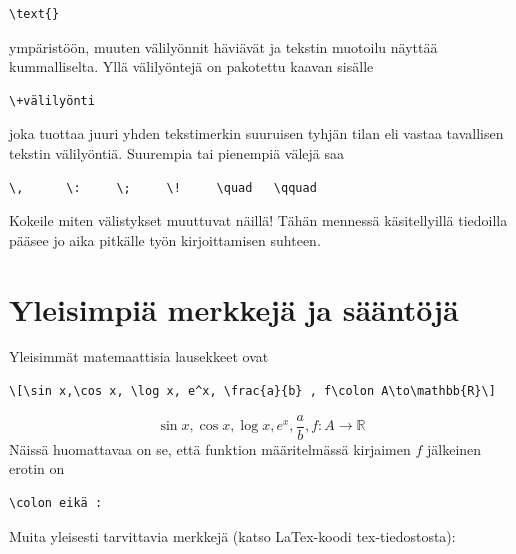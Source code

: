 \documentclass[a4paper,12 pt]{article}
\theoremstyle{plain}
\theoremstyle{definition}
\theoremstyle{remark}
\numberwithin{equation}{section}
\numberwithin{figure}{section}
\begin{document}
\begin{verbatim}
\text{}   
\end{verbatim}
ympäristöön, muuten välilyönnit häviävät ja tekstin muotoilu näyttää kummalliselta. Yllä välilyöntejä on pakotettu kaavan sisälle 

\begin{verbatim}
\+välilyönti
\end{verbatim}
joka tuottaa juuri yhden tekstimerkin suuruisen tyhjän tilan eli vastaa tavallisen tekstin välilyöntiä. Suurempia tai pienempiä välejä saa 

\begin{verbatim}
\,      \:     \;     \!     \quad   \qquad
\end{verbatim}
Kokeile miten välistykset muuttuvat näillä! Tähän mennessä käsitellyillä tiedoilla pääsee jo aika pitkälle työn kirjoittamisen suhteen. 

\section{Yleisimpiä merkkejä ja sääntöjä}


Yleisimmät matemaattisia lausekkeet ovat

\begin{verbatim}
\[\sin x,\cos x, \log x, e^x, \frac{a}{b} , f\colon A\to\mathbb{R}\]  
\end{verbatim}

\[\sin x,\cos x, \log x, e^x, \frac{a}{b}, f\colon A\to\mathbb{R}\]
Näissä huomattavaa on se, että funktion määritelmässä kirjaimen $f$ jälkeinen erotin on

\begin{verbatim}
\colon eikä :
\end{verbatim}




Muita yleisesti tarvittavia merkkejä (katso LaTex-koodi tex-tiedostosta):
\end{document}
